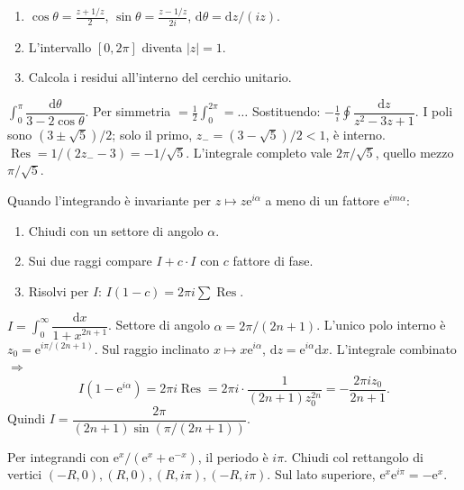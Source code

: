 \documentclass[11pt,a4paper,openany]{book}
\theoremstyle{definition}
\newcommand{\dd}{\mathrm{d}}
\newcommand{\eu}{\mathrm{e}}
\DeclareMathOperator{\Res}{Res}
\begin{document}
\begin{algoritmo}[Trigonometrico via $z=\eu^{i\theta}$]
\begin{enumerate}
\item $\cos\theta=\tfrac{z+1/z}{2}$, $\sin\theta=\tfrac{z-1/z}{2i}$, $\dd\theta=\dd z/(iz)$.
\item L'intervallo $[0,2\pi]$ diventa $|z|=1$.
\item Calcola i residui all'interno del cerchio unitario.
\end{enumerate}
\end{algoritmo}

\begin{esempio}[Scritto 15/01/2024, Es. 2]
$\int_0^\pi \dfrac{\dd\theta}{3-2\cos\theta}$. Per simmetria $=\tfrac 1 2\int_0^{2\pi}=\dots$ Sostituendo: $-\tfrac{1}{i}\oint\dfrac{\dd z}{z^2-3z+1}$. I poli sono $(3\pm\sqrt 5)/2$; solo il primo, $z_-=(3-\sqrt 5)/2<1$, \`e interno. $\Res=1/(2z_--3)=-1/\sqrt 5$. L'integrale completo vale $2\pi/\sqrt 5$, quello mezzo $\pi/\sqrt 5$.
\end{esempio}

\begin{algoritmo}[Settore di angolo $\alpha=2\pi/n$]
Quando l'integrando \`e invariante per $z\mapsto z\eu^{i\alpha}$ a meno di un fattore $\eu^{im\alpha}$:
\begin{enumerate}
\item Chiudi con un settore di angolo $\alpha$.
\item Sui due raggi compare $I+c\cdot I$ con $c$ fattore di fase.
\item Risolvi per $I$: $I(1-c)=2\pi i\sum\Res$.
\end{enumerate}
\end{algoritmo}

\begin{esempio}[Scritto 12/02/2025, Es. 2]
$I=\int_0^\infty\dfrac{\dd x}{1+x^{2n+1}}$. Settore di angolo $\alpha=2\pi/(2n+1)$. L'unico polo interno \`e $z_0=\eu^{i\pi/(2n+1)}$. Sul raggio inclinato $x\mapsto x\eu^{i\alpha}$, $\dd z=\eu^{i\alpha}\dd x$. L'integrale combinato $\Rightarrow$
$$I(1-\eu^{i\alpha})=2\pi i\Res=2\pi i\cdot\frac{1}{(2n+1)z_0^{2n}}=-\frac{2\pi i z_0}{2n+1}.$$
Quindi $I=\dfrac{2\pi}{(2n+1)\sin(\pi/(2n+1))}$.
\end{esempio}

\begin{algoritmo}
Per integrandi con $\eu^x/(\eu^x+\eu^{-x})$, il periodo \`e $i\pi$. Chiudi col rettangolo di vertici $(-R,0),(R,0),(R,i\pi),(-R,i\pi)$. Sul lato superiore, $\eu^x\eu^{i\pi}=-\eu^x$.
\end{algoritmo}
\end{document}
